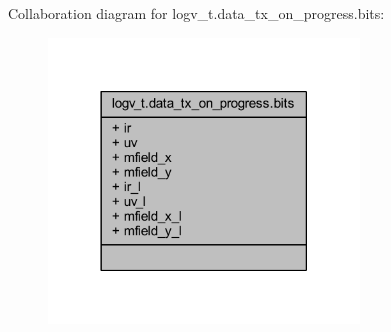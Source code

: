 Collaboration diagram for logv\+\_\+t.\+data\+\_\+tx\+\_\+on\+\_\+progress.\+bits\+:\nopagebreak
\begin{figure}[H]
\begin{center}
\leavevmode
\includegraphics[width=234pt]{d7/d46/a00890}
\end{center}
\end{figure}
